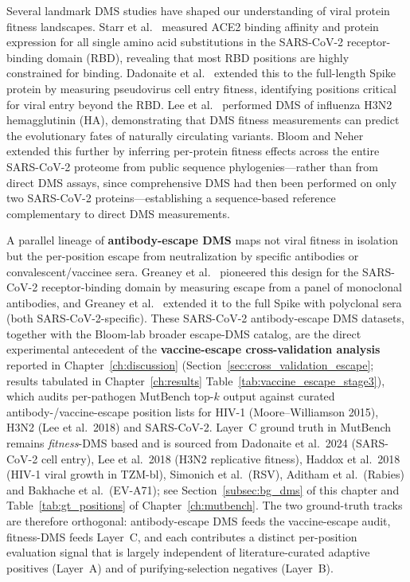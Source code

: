Several landmark DMS studies have shaped our understanding of viral protein fitness landscapes.
Starr et al.~\cite{starr2020dms} measured ACE2 binding affinity and protein expression for all single amino acid substitutions in the SARS-CoV-2 receptor-binding domain (RBD), revealing that most RBD positions are highly constrained for binding.
Dadonaite et al.~\cite{dadonaite2023dms} extended this to the full-length Spike protein by measuring pseudovirus cell entry fitness, identifying positions critical for viral entry beyond the RBD.
Lee et al.~\cite{lee2018h3n2dms} performed DMS of influenza H3N2 hemagglutinin (HA), demonstrating that DMS fitness measurements can predict the evolutionary fates of naturally circulating variants.
Bloom and Neher~\cite{bloom2023fitness} extended this further by inferring per-protein fitness effects across the entire SARS-CoV-2 proteome from public sequence phylogenies---rather than from direct DMS assays, since comprehensive DMS had then been performed on only two SARS-CoV-2 proteins---establishing a sequence-based reference complementary to direct DMS measurements.

A parallel lineage of \textbf{antibody-escape DMS} maps not viral fitness in isolation but the per-position escape from neutralization by specific antibodies or convalescent/vaccinee sera. Greaney et al.~\cite{greaney2021RBD} pioneered this design for the SARS-CoV-2 receptor-binding domain by measuring escape from a panel of monoclonal antibodies, and Greaney et al.~\cite{greaney2022spike} extended it to the full Spike with polyclonal sera (both SARS-CoV-2-specific). These SARS-CoV-2 antibody-escape DMS datasets, together with the Bloom-lab broader escape-DMS catalog, are the direct experimental antecedent of the \textbf{vaccine-escape cross-validation analysis} reported in Chapter~\ref{ch:discussion} (Section~\ref{sec:cross_validation_escape}; results tabulated in Chapter~\ref{ch:results} Table~\ref{tab:vaccine_escape_stage3}), which audits per-pathogen MutBench top-$k$ output against curated antibody-/vaccine-escape position lists for HIV-1 (Moore--Williamson 2015), H3N2 (Lee et al.~2018) and SARS-CoV-2. Layer~C ground truth in MutBench remains \emph{fitness}-DMS based and is sourced from Dadonaite et al.~2024 (SARS-CoV-2 cell entry), Lee et al.~2018 (H3N2 replicative fitness), Haddox et al.~2018 (HIV-1 viral growth in TZM-bl), Simonich et al.\ (RSV), Aditham et al.\ (Rabies) and Bakhache et al.\ (EV-A71); see Section~\ref{subsec:bg_dms} of this chapter and Table~\ref{tab:gt_positions} of Chapter~\ref{ch:mutbench}. The two ground-truth tracks are therefore orthogonal: antibody-escape DMS feeds the vaccine-escape audit, fitness-DMS feeds Layer~C, and each contributes a distinct per-position evaluation signal that is largely independent of literature-curated adaptive positives (Layer~A) and of purifying-selection negatives (Layer~B).

